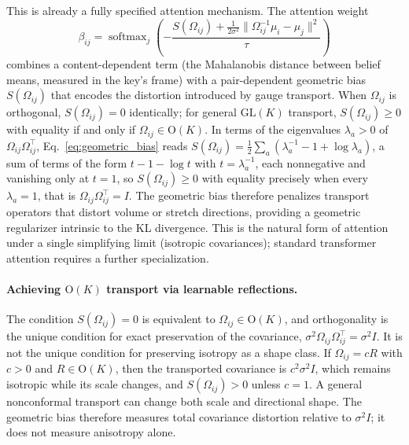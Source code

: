 \documentclass[twoside,11pt]{article}
\begin{document}
This is already a fully specified attention mechanism. The attention weight
\begin{equation}
\beta_{ij} = \operatorname{softmax}_j \left(-\frac{S(\Omega_{ij}) + \frac{1}{2\sigma^2}\|\Omega_{ij}^{-1}\mu_i - \mu_j\|^2}{\tau}\right)
\label{eq:general_isotropic_attention}
\end{equation}
combines a content-dependent term (the Mahalanobis distance between belief means, measured in the key's frame) with a pair-dependent geometric bias $S(\Omega_{ij})$ that encodes the distortion introduced by gauge transport. When $\Omega_{ij}$ is orthogonal, $S(\Omega_{ij}) = 0$ identically; for general $\mathrm{GL}(K)$ transport, $S(\Omega_{ij}) \geq 0$ with equality if and only if $\Omega_{ij} \in \mathrm{O}(K)$. In terms of the eigenvalues $\lambda_a > 0$ of $\Omega_{ij}\Omega_{ij}^\top$, Eq.~\eqref{eq:geometric_bias} reads $S(\Omega_{ij}) = \tfrac{1}{2}\sum_a(\lambda_a^{-1} - 1 + \log\lambda_a)$, a sum of terms of the form $t - 1 - \log t$ with $t = \lambda_a^{-1}$, each nonnegative and vanishing only at $t = 1$, so $S(\Omega_{ij}) \geq 0$ with equality precisely when every $\lambda_a = 1$, that is $\Omega_{ij}\Omega_{ij}^\top = I$. The geometric bias therefore penalizes transport operators that distort volume or stretch directions, providing a geometric regularizer intrinsic to the KL divergence. This is the natural form of attention under a single simplifying limit (isotropic covariances); standard transformer attention requires a further specialization.

\paragraph{Achieving $\mathrm{O}(K)$ transport via learnable reflections.}
\label{par:ok_transport}

The condition $S(\Omega_{ij}) = 0$ is equivalent to $\Omega_{ij} \in \mathrm{O}(K)$, and orthogonality is the unique condition for exact preservation of the covariance, $\sigma^2\Omega_{ij}\Omega_{ij}^\top=\sigma^2I$. It is not the unique condition for preserving isotropy as a shape class. If $\Omega_{ij}=cR$ with $c>0$ and $R\in\mathrm{O}(K)$, then the transported covariance is $c^2\sigma^2I$, which remains isotropic while its scale changes, and $S(\Omega_{ij})>0$ unless $c=1$. A general nonconformal transport can change both scale and directional shape. The geometric bias therefore measures total covariance distortion relative to $\sigma^2I$; it does not measure anisotropy alone.
\end{document}

